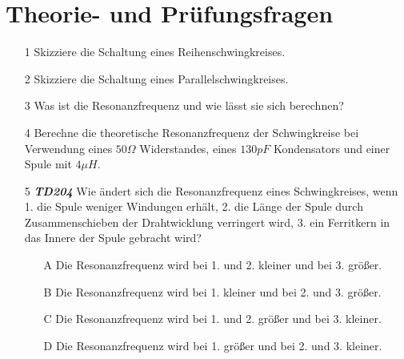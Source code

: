 \section*{Theorie- und Prüfungsfragen}

\begin{enumerate}
  \itemsep1pt\parskip0pt
  \item[1] Skizziere die Schaltung eines Reihenschwingkreises.
  \item[2] Skizziere die Schaltung eines Parallelschwingkreises.
  \item[3] Was ist die Resonanzfrequenz und wie lässt sie sich berechnen?
  \item[4] Berechne die theoretische Resonanzfrequenz der Schwingkreise bei
    Verwendung eines $50\Omega$ Widerstandes, eines $130 pF$ Kondensators und
    einer Spule mit $4\mu H$.
\end{enumerate}



\begin{enumerate}
\item[5] \emph{\textbf{TD204}}    Wie ändert sich die Resonanzfrequenz eines Schwingkreises, wenn 1. die Spule weniger Windungen erhält, 2. die Länge der Spule durch Zusammenschieben der Drahtwicklung verringert wird, 3. ein Ferritkern in das Innere der Spule gebracht wird? 
	\begin{enumerate}
	\itemsep1pt\parskip0pt
		\item[A] Die Resonanzfrequenz wird bei 1. und 2. kleiner und bei 3. größer. 
		\item[B] Die Resonanzfrequenz wird bei 1. kleiner und bei 2. und 3. größer.
		\item[C] Die Resonanzfrequenz wird bei 1. und 2. größer und bei 3. kleiner.
		\item[D] Die Resonanzfrequenz wird bei 1. größer und bei 2. und 3. kleiner. 
	\end{enumerate}
\end{enumerate}



